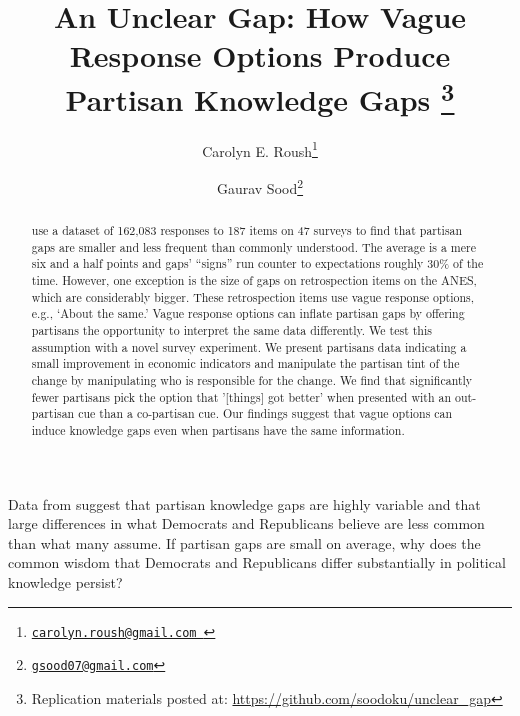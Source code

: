 \documentclass[12pt, letterpaper]{article}
\title{An Unclear Gap: How Vague Response Options Produce Partisan Knowledge Gaps \thanks{Replication materials posted at: \url{ https://github.com/soodoku/unclear_gap}}}
\author{Carolyn E. Roush\thanks{\href{mailto:carolyn.roush@gmail.com}{\texttt{carolyn.roush@gmail.com }}} \and Gaurav Sood\thanks{\href{mailto:gsood07@gmail.com}{\texttt{gsood07@gmail.com}}}}
\begin{document}
\maketitle
\thispagestyle{empty}

\begin{abstract}

\noindent \citet{roush_2021} use a dataset of 162,083 responses to 187 items on 47 surveys to find that partisan gaps are smaller and less frequent than commonly understood. The average is a mere six and a half points and gaps' ``signs'' run counter to expectations roughly 30\% of the time. However, one exception is the size of gaps on retrospection items on the ANES, which are considerably bigger. These retrospection items use vague response options, e.g., `About the same.' Vague response options can inflate partisan gaps by offering partisans the opportunity to interpret the same data differently. We test this assumption with a novel survey experiment. We present partisans data indicating a small improvement in economic indicators and manipulate the partisan tint of the change by manipulating who is responsible for the change. We find that significantly fewer partisans pick the option that '[things] got better' when presented with an out-partisan cue than a co-partisan cue. Our findings suggest that vague options can induce knowledge gaps even when partisans have the same information.
\end{abstract}

\vspace{.2in}


\newpage

\doublespacing
Data from \citet{roush_2021} suggest that partisan knowledge gaps are highly variable and that large differences in what Democrats and Republicans believe are less common than what many assume. If partisan gaps are small on average, why does the common wisdom that Democrats and Republicans differ substantially in political knowledge persist? 
\end{document}
